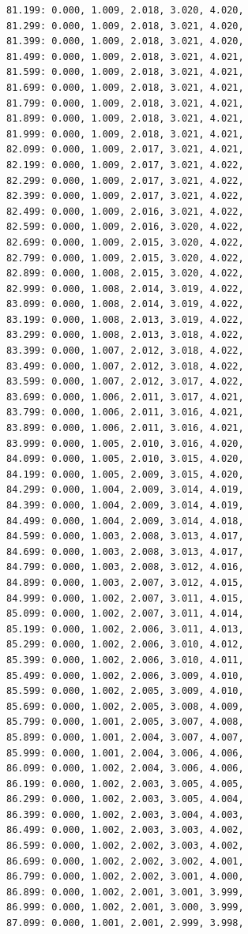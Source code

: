 \documentclass[12pt, a4paper]{article}
\begin{document}
\begin{scriptsize}
\begin{ttfamily}
\begin{lstlisting}
81.199: 0.000, 1.009, 2.018, 3.020, 4.020, 
81.299: 0.000, 1.009, 2.018, 3.021, 4.020, 
81.399: 0.000, 1.009, 2.018, 3.021, 4.020, 
81.499: 0.000, 1.009, 2.018, 3.021, 4.021, 
81.599: 0.000, 1.009, 2.018, 3.021, 4.021, 
81.699: 0.000, 1.009, 2.018, 3.021, 4.021, 
81.799: 0.000, 1.009, 2.018, 3.021, 4.021, 
81.899: 0.000, 1.009, 2.018, 3.021, 4.021, 
81.999: 0.000, 1.009, 2.018, 3.021, 4.021, 
82.099: 0.000, 1.009, 2.017, 3.021, 4.021, 
82.199: 0.000, 1.009, 2.017, 3.021, 4.022, 
82.299: 0.000, 1.009, 2.017, 3.021, 4.022, 
82.399: 0.000, 1.009, 2.017, 3.021, 4.022, 
82.499: 0.000, 1.009, 2.016, 3.021, 4.022, 
82.599: 0.000, 1.009, 2.016, 3.020, 4.022, 
82.699: 0.000, 1.009, 2.015, 3.020, 4.022, 
82.799: 0.000, 1.009, 2.015, 3.020, 4.022, 
82.899: 0.000, 1.008, 2.015, 3.020, 4.022, 
82.999: 0.000, 1.008, 2.014, 3.019, 4.022, 
83.099: 0.000, 1.008, 2.014, 3.019, 4.022, 
83.199: 0.000, 1.008, 2.013, 3.019, 4.022, 
83.299: 0.000, 1.008, 2.013, 3.018, 4.022, 
83.399: 0.000, 1.007, 2.012, 3.018, 4.022, 
83.499: 0.000, 1.007, 2.012, 3.018, 4.022, 
83.599: 0.000, 1.007, 2.012, 3.017, 4.022, 
83.699: 0.000, 1.006, 2.011, 3.017, 4.021, 
83.799: 0.000, 1.006, 2.011, 3.016, 4.021, 
83.899: 0.000, 1.006, 2.011, 3.016, 4.021, 
83.999: 0.000, 1.005, 2.010, 3.016, 4.020, 
84.099: 0.000, 1.005, 2.010, 3.015, 4.020, 
84.199: 0.000, 1.005, 2.009, 3.015, 4.020, 
84.299: 0.000, 1.004, 2.009, 3.014, 4.019, 
84.399: 0.000, 1.004, 2.009, 3.014, 4.019, 
84.499: 0.000, 1.004, 2.009, 3.014, 4.018, 
84.599: 0.000, 1.003, 2.008, 3.013, 4.017, 
84.699: 0.000, 1.003, 2.008, 3.013, 4.017, 
84.799: 0.000, 1.003, 2.008, 3.012, 4.016, 
84.899: 0.000, 1.003, 2.007, 3.012, 4.015, 
84.999: 0.000, 1.002, 2.007, 3.011, 4.015, 
85.099: 0.000, 1.002, 2.007, 3.011, 4.014, 
85.199: 0.000, 1.002, 2.006, 3.011, 4.013, 
85.299: 0.000, 1.002, 2.006, 3.010, 4.012, 
85.399: 0.000, 1.002, 2.006, 3.010, 4.011, 
85.499: 0.000, 1.002, 2.006, 3.009, 4.010, 
85.599: 0.000, 1.002, 2.005, 3.009, 4.010, 
85.699: 0.000, 1.002, 2.005, 3.008, 4.009, 
85.799: 0.000, 1.001, 2.005, 3.007, 4.008, 
85.899: 0.000, 1.001, 2.004, 3.007, 4.007, 
85.999: 0.000, 1.001, 2.004, 3.006, 4.006, 
86.099: 0.000, 1.002, 2.004, 3.006, 4.006, 
86.199: 0.000, 1.002, 2.003, 3.005, 4.005, 
86.299: 0.000, 1.002, 2.003, 3.005, 4.004, 
86.399: 0.000, 1.002, 2.003, 3.004, 4.003, 
86.499: 0.000, 1.002, 2.003, 3.003, 4.002, 
86.599: 0.000, 1.002, 2.002, 3.003, 4.002, 
86.699: 0.000, 1.002, 2.002, 3.002, 4.001, 
86.799: 0.000, 1.002, 2.002, 3.001, 4.000, 
86.899: 0.000, 1.002, 2.001, 3.001, 3.999, 
86.999: 0.000, 1.002, 2.001, 3.000, 3.999, 
87.099: 0.000, 1.001, 2.001, 2.999, 3.998, 

\end{lstlisting}
\end{ttfamily}
\end{scriptsize}
\end{document}
